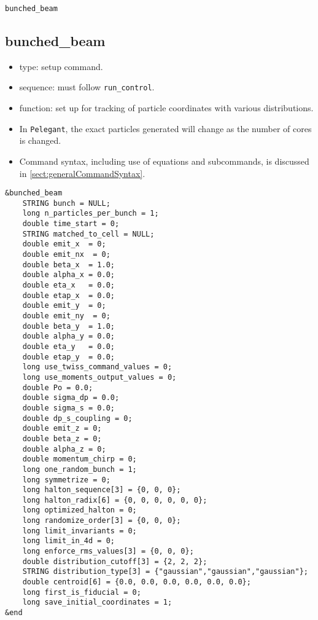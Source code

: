 \documentclass[11pt]{article}
\begin{document}
\newpage
\begin{center}{\Large\verb|bunched_beam|}\end{center}
\subsection{bunched\_beam \label{subsec:bunchedbeam}}

\begin{itemize}
\item type: setup command.
\item sequence: must follow \verb|run_control|.
\item function: set up for tracking of particle coordinates with various distributions.
\item In \verb|Pelegant|, the exact particles generated will change as the number of cores is changed.
\item Command syntax, including use of equations and subcommands, is discussed in \ref{sect:generalCommandSyntax}.
\end{itemize}

\begin{verbatim}
&bunched_beam
    STRING bunch = NULL;
    long n_particles_per_bunch = 1;
    double time_start = 0;
    STRING matched_to_cell = NULL;
    double emit_x  = 0;
    double emit_nx  = 0;
    double beta_x  = 1.0;
    double alpha_x = 0.0;
    double eta_x   = 0.0;
    double etap_x  = 0.0;
    double emit_y  = 0;
    double emit_ny  = 0;
    double beta_y  = 1.0;
    double alpha_y = 0.0;
    double eta_y   = 0.0;
    double etap_y  = 0.0;
    long use_twiss_command_values = 0;
    long use_moments_output_values = 0;
    double Po = 0.0;
    double sigma_dp = 0.0;
    double sigma_s = 0.0;
    double dp_s_coupling = 0;
    double emit_z = 0;
    double beta_z = 0;
    double alpha_z = 0;
    double momentum_chirp = 0;
    long one_random_bunch = 1;
    long symmetrize = 0;
    long halton_sequence[3] = {0, 0, 0};
    long halton_radix[6] = {0, 0, 0, 0, 0, 0};
    long optimized_halton = 0;
    long randomize_order[3] = {0, 0, 0};
    long limit_invariants = 0;
    long limit_in_4d = 0;
    long enforce_rms_values[3] = {0, 0, 0};
    double distribution_cutoff[3] = {2, 2, 2};
    STRING distribution_type[3] = {"gaussian","gaussian","gaussian"};
    double centroid[6] = {0.0, 0.0, 0.0, 0.0, 0.0, 0.0};
    long first_is_fiducial = 0;
    long save_initial_coordinates = 1;
&end
\end{verbatim}
\end{document}
